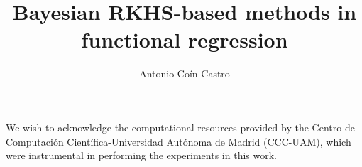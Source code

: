 \documentclass{mimosis}
\title{\textbf{Bayesian RKHS-based methods in functional regression}}
\author{Antonio Coín Castro}
\newcommand{\thesisPath}{chapters}
\newcommand{\titlecolor}{teal}
\renewcommand*{\chapterformat}{%
  \fontsize{60}{65}\selectfont\color{\titlecolor}\(\thechapter\)\autodot\enskip
}
\theoremstyle{theorem}
\theoremstyle{definition}
\theoremstyle{remark}
\begin{document}
\frontmatter
  
  

  \vspace*{-1.8cm}
  \tableofcontents

\mainmatter









\appendix

\renewcommand*{\chapterformat}{%
  \fontsize{60}{65}\selectfont\color{\titlecolor}\thechapter\autodot\enskip
}





\backmatter

\printbibliography

\begin{center}
\color{teal}\FourStar
\end{center}

\begin{small}
We wish to acknowledge the computational resources provided by the Centro de Computación Científica-Universidad Autónoma de Madrid (CCC-UAM), which were instrumental in performing the experiments in this work.
\end{small}
\end{document}
